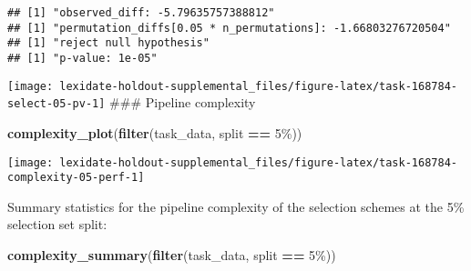 \documentclass[
]{book}
\newenvironment{Shaded}{\begin{snugshade}}{\end{snugshade}}
\newcommand{\AttributeTok}[1]{\textcolor[rgb]{0.13,0.29,0.53}{#1}}
\newcommand{\DecValTok}[1]{\textcolor[rgb]{0.00,0.00,0.81}{#1}}
\newcommand{\FunctionTok}[1]{\textcolor[rgb]{0.13,0.29,0.53}{\textbf{#1}}}
\newcommand{\NormalTok}[1]{#1}
\newcommand{\OtherTok}[1]{\textcolor[rgb]{0.56,0.35,0.01}{#1}}
\newcommand{\SpecialCharTok}[1]{\textcolor[rgb]{0.81,0.36,0.00}{\textbf{#1}}}
\newcommand{\StringTok}[1]{\textcolor[rgb]{0.31,0.60,0.02}{#1}}
\begin{document}
\begin{Shaded}
\end{Shaded}

\begin{verbatim}
## [1] "observed_diff: -5.79635757388812"
## [1] "permutation_diffs[0.05 * n_permutations]: -1.66803276720504"
## [1] "reject null hypothesis"
## [1] "p-value: 1e-05"
\end{verbatim}

\texttt{[image: lexidate-holdout-supplemental\_files/figure-latex/task-168784-select-05-pv-1]}
\#\#\# Pipeline complexity

\begin{Shaded}
\begin{Highlighting}[]
\FunctionTok{complexity\_plot}\NormalTok{(}\FunctionTok{filter}\NormalTok{(task\_data, split }\SpecialCharTok{==} \StringTok{\textquotesingle{}5\%\textquotesingle{}}\NormalTok{))}
\end{Highlighting}
\end{Shaded}

\texttt{[image: lexidate-holdout-supplemental\_files/figure-latex/task-168784-complexity-05-perf-1]}

Summary statistics for the pipeline complexity of the selection schemes at the 5\% selection set split:

\begin{Shaded}
\begin{Highlighting}[]
\FunctionTok{complexity\_summary}\NormalTok{(}\FunctionTok{filter}\NormalTok{(task\_data, split }\SpecialCharTok{==} \StringTok{\textquotesingle{}5\%\textquotesingle{}}\NormalTok{))}
\end{Highlighting}
\end{Shaded}
\end{document}
